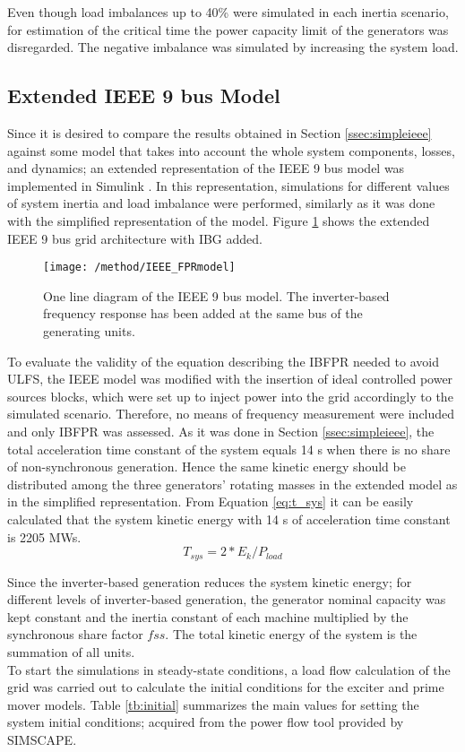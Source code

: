 Even though load imbalances up to 40\% were simulated in each inertia scenario, for estimation of the critical time the power capacity limit of the generators was disregarded. The negative imbalance was simulated by increasing the system load.

\subsection{Extended IEEE 9 bus Model}

Since it is desired to compare the results obtained in Section \ref{ssec:simpleieee} against some model that takes into account the whole system components, losses, and dynamics; an extended representation of the IEEE 9 bus model was implemented in Simulink \cite{delavari2018simscape}. In this representation, simulations for different values of system inertia and load imbalance were performed, similarly as it was done with the simplified representation of the model. Figure \ref{fig:ieeeext} shows the extended IEEE 9 bus grid architecture with IBG added.\\
\begin{figure}[h]
	\centering
	\texttt{[image: /method/IEEE\_FPRmodel]}
	\caption{One line diagram of the IEEE 9 bus model. The inverter-based frequency response has been added at the same bus of the generating units.}
	\label{fig:ieeeext}
\end{figure}
To evaluate the validity of the equation describing the IBFPR needed to avoid ULFS, the IEEE model was modified with the insertion of ideal controlled power sources blocks, which were set up to inject power into the grid accordingly to the simulated scenario. Therefore, no means of frequency measurement were included and only IBFPR was assessed.
As it was done in Section \ref{ssec:simpleieee}, the total acceleration time constant of the system equals 14 s when there is no share of non-synchronous generation. Hence the same kinetic energy should be distributed among the three generators' rotating masses in the extended model as in the simplified representation. From Equation \eqref{eq:t_sys} it can be easily calculated that the system kinetic energy with 14 s of acceleration time constant is 2205 MWs.
\begin{equation}
\label{eq:t_sys}
T_{sys}=2*E_{k} /P_{load}
\end{equation}

Since the inverter-based generation reduces the system kinetic energy; for different levels of inverter-based generation, the generator nominal capacity was kept constant and the inertia constant of each machine multiplied by the synchronous share factor $ fss $. The total kinetic energy of the system is the summation of all units.\\
To start the simulations in steady-state conditions, a load flow calculation of the grid was carried out to calculate the initial conditions for the exciter and prime mover models.
Table \ref{tb:initial} summarizes the main values for setting the system initial conditions; acquired from the power flow tool provided by SIMSCAPE.


